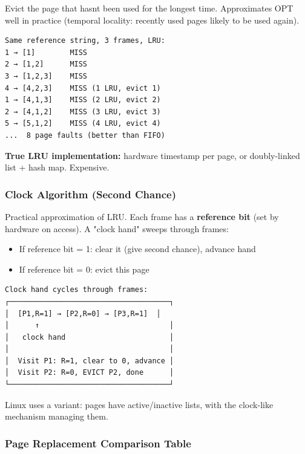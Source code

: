 \documentclass[11pt]{article}
\providecommand{\tightlist}{\setlength{\itemsep}{1pt}\setlength{\parskip}{0pt}}
\begin{document}
Evict the page that hasn\textquotesingle t been used for the longest time. Approximates OPT well in practice (temporal locality: recently used pages likely to be used again).

\setcodelang{}

\begin{verbatim}
Same reference string, 3 frames, LRU:
1 → [1]        MISS
2 → [1,2]      MISS
3 → [1,2,3]    MISS
4 → [4,2,3]    MISS (1 LRU, evict 1)
1 → [4,1,3]    MISS (2 LRU, evict 2)
2 → [4,1,2]    MISS (3 LRU, evict 3)
5 → [5,1,2]    MISS (4 LRU, evict 4)
...  8 page faults (better than FIFO)
\end{verbatim}

\textbf{True LRU implementation:} hardware timestamp per page, or doubly-linked list + hash map. Expensive.

\subsubsection{Clock Algorithm (Second Chance)}\label{clock-algorithm-second-chance}

Practical approximation of LRU. Each frame has a \textbf{reference bit} (set by hardware on access). A "clock hand" sweeps through frames:

\begin{itemize}
\tightlist
\item
  If reference bit = 1: clear it (give second chance), advance hand
\item
  If reference bit = 0: evict this page
\end{itemize}

\setcodelang{}

\begin{verbatim}
Clock hand cycles through frames:
┌─────────────────────────────────────┐
│  [P1,R=1] → [P2,R=0] → [P3,R=1]  │
│      ↑                              │
│   clock hand                        │
│                                     │
│  Visit P1: R=1, clear to 0, advance │
│  Visit P2: R=0, EVICT P2, done      │
└─────────────────────────────────────┘
\end{verbatim}

Linux uses a variant: pages have active/inactive lists, with the clock-like mechanism managing them.

\subsubsection{Page Replacement Comparison Table}\label{page-replacement-comparison-table}
\end{document}
